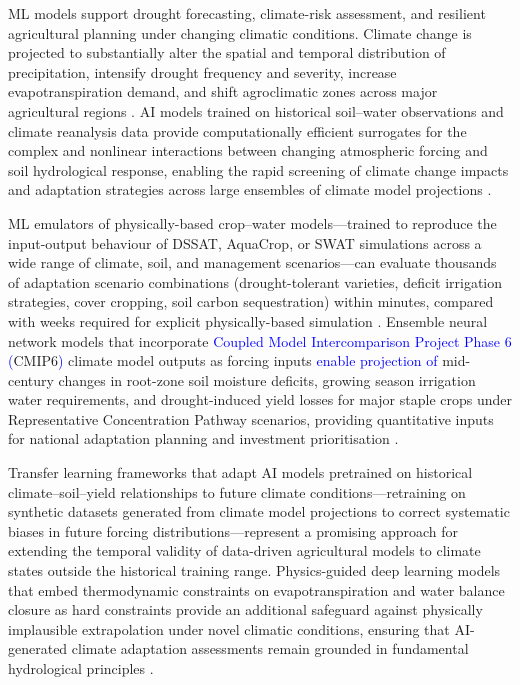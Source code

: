 \documentclass[land,article,submit,pdftex,moreauthors]{Definitions/mdpi}
\numberwithin{equation}{section}
\begin{document}
ML models support drought forecasting, climate-risk assessment, and resilient agricultural planning under changing climatic conditions. Climate change is projected to substantially alter the spatial and temporal distribution of precipitation, intensify drought frequency and severity, increase evapotranspiration demand, and shift agroclimatic zones across major agricultural regions \citep{ipcc2022ar6}. AI models trained on historical soil--water observations and climate reanalysis data provide computationally efficient surrogates for the complex and nonlinear interactions between changing atmospheric forcing and soil hydrological response, enabling the rapid screening of climate change impacts and adaptation strategies across large ensembles of climate model projections \citep{trnka2022soil}.

ML emulators of physically-based crop--water models---trained to reproduce the input-output behaviour of DSSAT, AquaCrop, or SWAT simulations across a wide range of climate, soil, and management scenarios---can evaluate thousands of adaptation scenario combinations (drought-tolerant varieties, deficit irrigation strategies, cover cropping, soil carbon sequestration) within minutes, compared with weeks required for explicit physically-based simulation \citep{Meng}. Ensemble neural network models that incorporate \textcolor{blue}{Coupled Model Intercomparison Project Phase 6 (}CMIP6\textcolor{blue}{)} climate model outputs as forcing inputs \textcolor{blue}{enable projection of} mid-century changes in root-zone soil moisture deficits, growing season irrigation water requirements, and drought-induced yield losses for major staple crops under Representative Concentration Pathway scenarios, providing quantitative inputs for national adaptation planning and investment prioritisation \citep{trnka2022soil}.

Transfer learning frameworks that adapt AI models pretrained on historical climate--soil--yield relationships to future climate conditions---retraining on synthetic datasets generated from climate model projections to correct systematic biases in future forcing distributions---represent a promising approach for extending the temporal validity of data-driven agricultural models to climate states outside the historical training range. Physics-guided deep learning models that embed thermodynamic constraints on evapotranspiration and water balance closure as hard constraints provide an additional safeguard against physically implausible extrapolation under novel climatic conditions, ensuring that AI-generated climate adaptation assessments remain grounded in fundamental hydrological principles \citep{willard2022integrating}.
\end{document}
